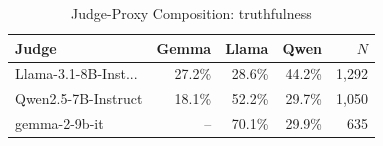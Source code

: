 \begin{table}[htbp]
\centering
\caption{Judge-Proxy Composition: truthfulness}
\label{tab:composition_truthfulness}
\begin{tabular}{lrrrr}
\toprule
Judge & Gemma & Llama & Qwen & $N$ \\
\midrule
Llama-3.1-8B-Inst... & 27.2\% & 28.6\% & 44.2\% & 1,292 \\
Qwen2.5-7B-Instruct & 18.1\% & 52.2\% & 29.7\% & 1,050 \\
gemma-2-9b-it & -- & 70.1\% & 29.9\% & 635 \\
\bottomrule
\end{tabular}
\end{table}